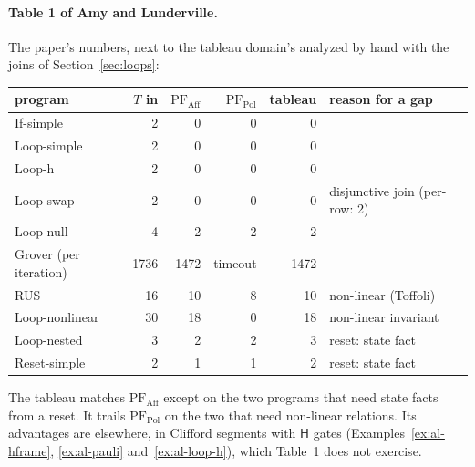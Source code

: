 \documentclass[11pt]{article}
\theoremstyle{definition}
\theoremstyle{remark}
\newcommand{\gate}[1]{\mathsf{#1}}
\begin{document}
\paragraph{Table 1 of Amy and Lunderville.}
The paper's numbers, next to the tableau domain's analyzed by hand with the joins of
Section~\ref{sec:loops}:

\begin{center}
\small
\begin{tabular}{@{}lrrrrl@{}}
\toprule
program & $T$ in & $\mathrm{PF}_{\mathrm{Aff}}$ & $\mathrm{PF}_{\mathrm{Pol}}$ & tableau & reason for a gap \\
\midrule
If-simple & 2 & 0 & 0 & 0 & \\
Loop-simple & 2 & 0 & 0 & 0 & \\
Loop-h & 2 & 0 & 0 & 0 & \\
Loop-swap & 2 & 0 & 0 & 0 & disjunctive join (per-row: 2) \\
Loop-null & 4 & 2 & 2 & 2 & \\
Grover (per iteration) & 1736 & 1472 & timeout & 1472 & \\
RUS & 16 & 10 & 8 & 10 & non-linear (Toffoli) \\
Loop-nonlinear & 30 & 18 & 0 & 18 & non-linear invariant \\
Loop-nested & 3 & 2 & 2 & 3 & reset: state fact \\
Reset-simple & 2 & 1 & 1 & 2 & reset: state fact \\
\bottomrule
\end{tabular}
\end{center}

The tableau matches $\mathrm{PF}_{\mathrm{Aff}}$ except on the two programs that need state
facts from a reset. It trails $\mathrm{PF}_{\mathrm{Pol}}$ on the two that need non-linear
relations. Its advantages are elsewhere, in Clifford segments with $\gate H$ gates
(Examples~\ref{ex:al-hframe}, \ref{ex:al-pauli} and~\ref{ex:al-loop-h}), which Table~1 does
not exercise.
\end{document}
